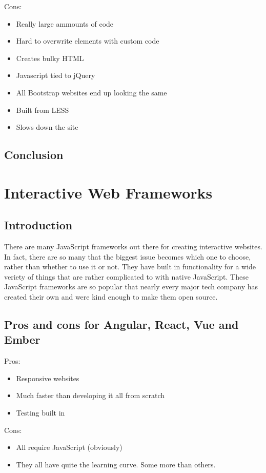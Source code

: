 \documentclass[draftclsnofoot,onecolumn,letterpaper,10pt,compsoc]{IEEEtran}
\begin{document}
  Cons:
  \begin{itemize}
    \item Really large ammounts of code
    \item Hard to overwrite elements with custom code
    \item Creates bulky HTML
    \item Javascript tied to jQuery
    \item All Bootstrap websites end up looking the same
    \item Built from LESS
    \item Slows down the site
  \end{itemize}

  \subsection{Conclusion}

\section{Interactive Web Frameworks}
  \subsection{Introduction}

  There are many JavaScript frameworks out there for creating interactive websites.
  In fact, there are so many that the biggest issue becomes which one to choose, rather than whether to use it or not.
  They have built in functionality for a wide veriety of things that are rather complicated to with native JavaScript.
  These JavaScript frameworks are so popular that nearly every major tech company has created their own and were kind enough to make them open source.


  \subsection{Pros and cons for Angular, React, Vue and Ember}
  Pros:
  \begin{itemize}
    \item Responsive websites
    \item Much faster than developing it all from scratch
    \item Testing built in
  \end{itemize}

  Cons:
  \begin{itemize}
    \item All require JavaScript (obviously)
    \item They all have quite the learning curve. Some more than others.
  \end{itemize}
\end{document}
